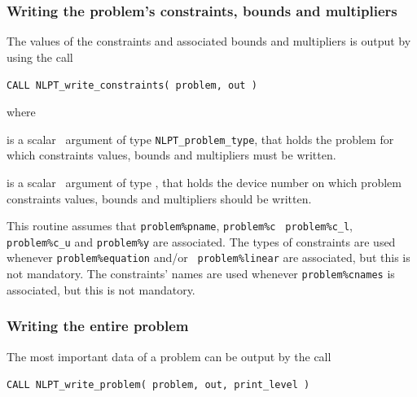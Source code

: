 \documentclass{galahad}
\newcommand{\packagename}{NLPT}
\begin{document}
\subsubsection{Writing the problem's constraints, bounds and multipliers}
\label{w_cons}

The values of the constraints and associated bounds and multipliers is output
by using the call
\vspace*{1mm}

\hspace{8mm}
{\tt CALL \packagename\_write\_constraints( problem, out )}

\noindent where
\begin{description}
 is a scalar \intentin\ argument of type {\tt NLPT\_problem\_type},
that holds the problem for which constraints values, bounds and multipliers
must be written.

 is a scalar \intentin\ argument of type \integer, that
holds the device number on which problem constraints values, bounds and
multipliers should be written.
\end{description}

\noindent
This routine assumes that {\tt problem\%pname}, {\tt problem\%c} {\tt
problem\%c\_l}, {\tt problem\%c\_u} and {\tt problem\%y} are associated.  The
types of constraints are used whenever {\tt problem\%equation} and/or {\tt
problem\%linear} are associated, but this is not mandatory.  The constraints'
names are used whenever {\tt problem\%cnames} is associated, but this is not
mandatory.

\subsubsection{Writing the entire problem}
\label{w_prob}

The most important data of a problem can be output by the call
\vspace*{1mm}

\hspace{8mm}
{\tt CALL \packagename\_write\_problem( problem, out, print\_level )}
\end{document}
